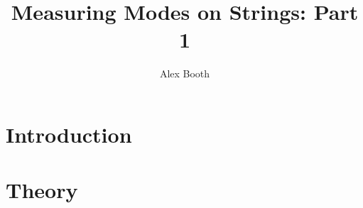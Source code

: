 \documentclass[11pt]{article}
\title{Measuring Modes on Strings: Part 1}
\author{Alex Booth}
\begin{document}
    \maketitle

    \section{Introduction}

    \section{Theory}

    
\end{document}
